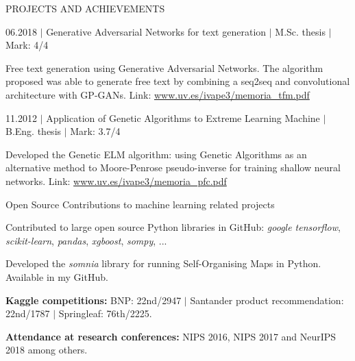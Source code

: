 \documentclass{resume} %
\begin{document}
\begin{rSection}{PROJECTS AND ACHIEVEMENTS}

\begin{rSubsection}{06.2018 $|$ Generative Adversarial Networks for text generation  $|$  \textnormal{M.Sc. thesis  $|$  Mark: 4/4}}{}{}{}  %

\vspace{-3pt}

\item Free text generation using Generative Adversarial Networks. The algorithm proposed was able to generate free text by combining a seq2seq and convolutional architecture with GP-GANs. Link: \href{https://www.uv.es/ivape3/memoria_tfm.pdf}{www.uv.es/ivape3/memoria\_tfm.pdf}

\end{rSubsection}

\vspace{-6pt}

\begin{rSubsection}{11.2012 $|$ Application of Genetic Algorithms to Extreme Learning Machine  $|$  \textnormal{B.Eng. thesis  $|$  Mark: 3.7/4}}
{}{}{}

\vspace{-3pt}

\item Developed the Genetic ELM algorithm: using Genetic Algorithms as an alternative method to Moore-Penrose pseudo-inverse for training shallow neural networks. Link: \href{https://www.uv.es/ivape3/memoria_pfc.pdf}{www.uv.es/ivape3/memoria\_pfc.pdf}

\end{rSubsection}

\vspace{-6pt}

\begin{rSubsection}{Open Source Contributions to machine learning related projects}
	{}{}{}

	\vspace{-3pt}

	\item Contributed to large open source Python libraries in GitHub: \textit{google tensorflow}, \textit{scikit-learn}, \textit{pandas}, \textit{xgboost}, \textit{sompy}, ...
	\item Developed the \textit{somnia} library for running Self-Organising Maps in Python. Available in my GitHub.
\end{rSubsection}

\vspace{-6pt}

\textbf{Kaggle competitions:} BNP: 22nd/2947 $|$ Santander product recommendation: 22nd/1787 $|$ Springleaf: 76th/2225.

\vspace{-6pt}

\textbf{Attendance at research conferences:} NIPS 2016, NIPS 2017 and NeurIPS 2018 among others.


\end{rSection}
\end{document}
